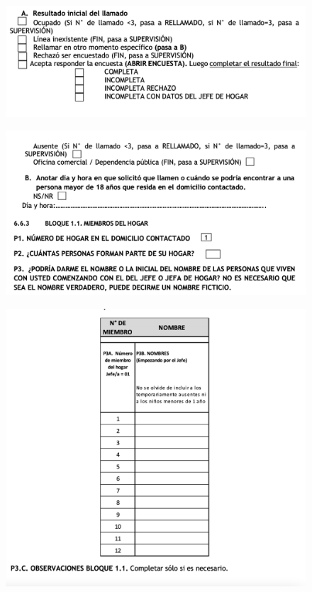 \documentclass[
  openany]{book}
\begin{document}
\begin{figure}

{\centering \includegraphics[width=1\linewidth]{imagenes/figura6-152} 

}

\end{figure}
\begin{figure}

{\centering \includegraphics[width=1\linewidth]{imagenes/figura6-153} 

}

\end{figure}
\begin{figure}

{\centering \includegraphics[width=1\linewidth]{imagenes/figura6-154} 

}

\end{figure}
\end{document}
